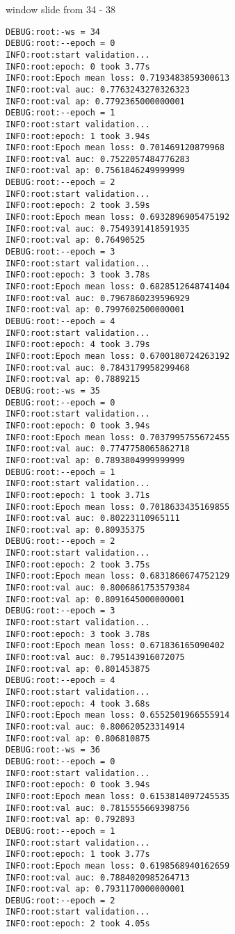 \documentclass[11pt]{article}
\begin{document}
window slide from 34 - 38
\begin{verbatim}
DEBUG:root:-ws = 34
DEBUG:root:--epoch = 0
INFO:root:start validation...
INFO:root:epoch: 0 took 3.77s
INFO:root:Epoch mean loss: 0.7193483859300613
INFO:root:val auc: 0.7763243270326323
INFO:root:val ap: 0.7792365000000001
DEBUG:root:--epoch = 1
INFO:root:start validation...
INFO:root:epoch: 1 took 3.94s
INFO:root:Epoch mean loss: 0.701469120879968
INFO:root:val auc: 0.7522057484776283
INFO:root:val ap: 0.7561846249999999
DEBUG:root:--epoch = 2
INFO:root:start validation...
INFO:root:epoch: 2 took 3.59s
INFO:root:Epoch mean loss: 0.6932896905475192
INFO:root:val auc: 0.7549391418591935
INFO:root:val ap: 0.76490525
DEBUG:root:--epoch = 3
INFO:root:start validation...
INFO:root:epoch: 3 took 3.78s
INFO:root:Epoch mean loss: 0.6828512648741404
INFO:root:val auc: 0.7967860239596929
INFO:root:val ap: 0.7997602500000001
DEBUG:root:--epoch = 4
INFO:root:start validation...
INFO:root:epoch: 4 took 3.79s
INFO:root:Epoch mean loss: 0.6700180724263192
INFO:root:val auc: 0.7843179958299468
INFO:root:val ap: 0.7889215
DEBUG:root:-ws = 35
DEBUG:root:--epoch = 0
INFO:root:start validation...
INFO:root:epoch: 0 took 3.94s
INFO:root:Epoch mean loss: 0.7037995755672455
INFO:root:val auc: 0.7747758065862718
INFO:root:val ap: 0.7893804999999999
DEBUG:root:--epoch = 1
INFO:root:start validation...
INFO:root:epoch: 1 took 3.71s
INFO:root:Epoch mean loss: 0.7018633435169855
INFO:root:val auc: 0.80223110965111
INFO:root:val ap: 0.80935375
DEBUG:root:--epoch = 2
INFO:root:start validation...
INFO:root:epoch: 2 took 3.75s
INFO:root:Epoch mean loss: 0.6831860674752129
INFO:root:val auc: 0.8006861753579384
INFO:root:val ap: 0.8091645000000001
DEBUG:root:--epoch = 3
INFO:root:start validation...
INFO:root:epoch: 3 took 3.78s
INFO:root:Epoch mean loss: 0.671836165090402
INFO:root:val auc: 0.795143916072075
INFO:root:val ap: 0.801453875
DEBUG:root:--epoch = 4
INFO:root:start validation...
INFO:root:epoch: 4 took 3.68s
INFO:root:Epoch mean loss: 0.6552501966555914
INFO:root:val auc: 0.800620523314914
INFO:root:val ap: 0.806810875
DEBUG:root:-ws = 36
DEBUG:root:--epoch = 0
INFO:root:start validation...
INFO:root:epoch: 0 took 3.94s
INFO:root:Epoch mean loss: 0.6153814097245535
INFO:root:val auc: 0.7815555669398756
INFO:root:val ap: 0.792893
DEBUG:root:--epoch = 1
INFO:root:start validation...
INFO:root:epoch: 1 took 3.77s
INFO:root:Epoch mean loss: 0.6198568940162659
INFO:root:val auc: 0.7884020985264713
INFO:root:val ap: 0.7931170000000001
DEBUG:root:--epoch = 2
INFO:root:start validation...
INFO:root:epoch: 2 took 4.05s

\end{verbatim}
\end{document}
